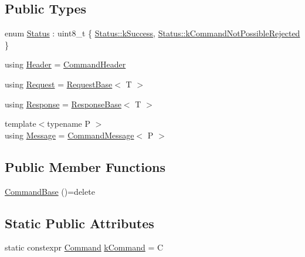 \subsection*{Public Types}
\begin{DoxyCompactItemize}
\item 
enum \hyperlink{structresearch__interface_1_1robot_1_1CommandBase_a63ff74649dc636bd79dc0dd34fb84df5}{Status} \+: uint8\+\_\+t \{ \hyperlink{structresearch__interface_1_1robot_1_1CommandBase_a63ff74649dc636bd79dc0dd34fb84df5a8c632159fa131f09d04f94e3cbcd8782}{Status\+::k\+Success}, 
\hyperlink{structresearch__interface_1_1robot_1_1CommandBase_a63ff74649dc636bd79dc0dd34fb84df5a168d00b46403240019d0b42f5a116cdd}{Status\+::k\+Command\+Not\+Possible\+Rejected}
 \}
\item 
using \hyperlink{structresearch__interface_1_1robot_1_1CommandBase_a886b3326733fe168fc4f6d52f3a58740}{Header} = \hyperlink{structresearch__interface_1_1robot_1_1CommandHeader}{Command\+Header}
\item 
using \hyperlink{structresearch__interface_1_1robot_1_1CommandBase_ac557e2cbde0100f01c0eab817254c009}{Request} = \hyperlink{structresearch__interface_1_1robot_1_1RequestBase}{Request\+Base}$<$ T $>$
\item 
using \hyperlink{structresearch__interface_1_1robot_1_1CommandBase_ae8b503e2bc7d72e70b6eb08421e0d853}{Response} = \hyperlink{structresearch__interface_1_1robot_1_1ResponseBase}{Response\+Base}$<$ T $>$
\item 
{\footnotesize template$<$typename P $>$ }\\using \hyperlink{structresearch__interface_1_1robot_1_1CommandBase_a969e615ce65a1309081591db384095d7}{Message} = \hyperlink{structresearch__interface_1_1robot_1_1CommandMessage}{Command\+Message}$<$ P $>$
\end{DoxyCompactItemize}
\subsection*{Public Member Functions}
\begin{DoxyCompactItemize}
\item 
\hyperlink{structresearch__interface_1_1robot_1_1CommandBase_adc575b11312036986496ff4a788cf836}{Command\+Base} ()=delete
\end{DoxyCompactItemize}
\subsection*{Static Public Attributes}
\begin{DoxyCompactItemize}
\item 
static constexpr \hyperlink{namespaceresearch__interface_1_1robot_a72624b344f0614e623ef21a53fb0aa50}{Command} \hyperlink{structresearch__interface_1_1robot_1_1CommandBase_a92be3ac33dc14e90a333dea827df76e6}{k\+Command} = C
\end{DoxyCompactItemize}


